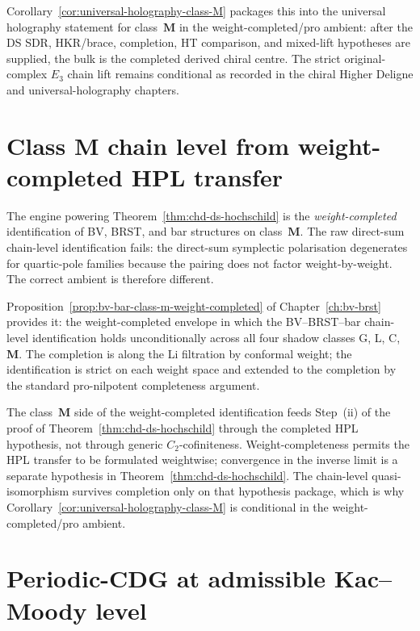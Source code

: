 Corollary~\ref{cor:universal-holography-class-M} packages this into
the universal holography statement for class~$\mathbf{M}$ in the
weight-completed/pro ambient: after the DS SDR, HKR/brace,
completion, HT comparison, and mixed-lift hypotheses are supplied, the
bulk is the completed derived chiral centre. The strict original-complex
$E_3$ chain lift remains conditional as recorded in the chiral Higher
Deligne and universal-holography chapters.

\section{Class $\mathbf{M}$ chain level from weight-completed HPL transfer}
\label{sec:part-viii-class-m-weight-completed}

The engine powering Theorem~\ref{thm:chd-ds-hochschild} is the
\emph{weight-completed} identification of BV, BRST, and bar structures
on class~$\mathbf{M}$. The raw direct-sum chain-level identification
fails: the direct-sum symplectic polarisation degenerates for
quartic-pole families because the pairing does not factor weight-by-weight.
The correct ambient is therefore different.

Proposition~\ref{prop:bv-bar-class-m-weight-completed} of
Chapter~\ref{ch:bv-brst} provides it: the weight-completed envelope
in which the BV--BRST--bar chain-level identification holds
unconditionally across all four shadow classes G, L, C, $\mathbf{M}$.
The completion is along the Li filtration by conformal weight; the
identification is strict on each weight space and extended to the
completion by the standard pro-nilpotent completeness argument.

The class~$\mathbf{M}$ side of the weight-completed identification
feeds Step~(ii) of the proof of Theorem~\ref{thm:chd-ds-hochschild}
through the completed HPL hypothesis, not through generic
\(C_{2}\)-cofiniteness. Weight-completeness permits the HPL transfer
to be formulated weightwise; convergence in the inverse limit is a
separate hypothesis in Theorem~\ref{thm:chd-ds-hochschild}. The
chain-level quasi-isomorphism survives completion only on that
hypothesis package, which is why
Corollary~\ref{cor:universal-holography-class-M} is conditional in the
weight-completed/pro ambient.

\section{Periodic-CDG at admissible Kac--Moody level}
\label{sec:part-viii-periodic-cdg}

